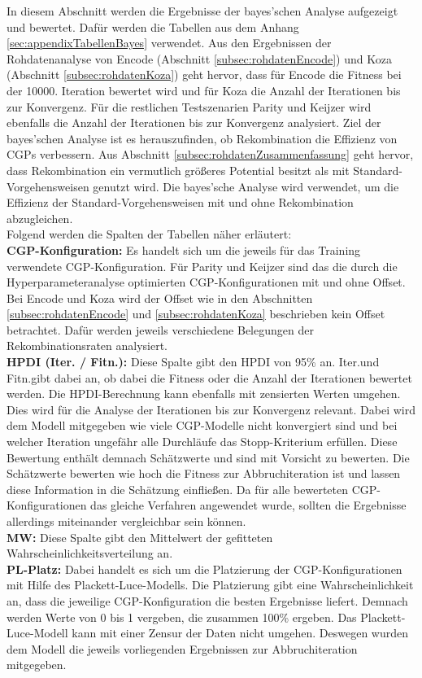 In diesem Abschnitt werden die Ergebnisse der bayes'schen Analyse aufgezeigt und bewertet.
Dafür werden die Tabellen aus dem Anhang \ref{sec:appendixTabellenBayes} verwendet.
Aus den Ergebnissen der Rohdatenanalyse von Encode (Abschnitt \ref{subsec:rohdatenEncode}) und Koza (Abschnitt \ref{subsec:rohdatenKoza}) geht hervor, dass für Encode die Fitness bei der 10000. Iteration bewertet wird und für Koza die Anzahl der Iterationen bis zur Konvergenz.
Für die restlichen Testszenarien Parity und Keijzer wird ebenfalls die Anzahl der Iterationen bis zur Konvergenz analysiert.
Ziel der bayes'schen Analyse ist es herauszufinden, ob Rekombination die Effizienz von CGPs verbessern.
Aus Abschnitt \ref{subsec:rohdatenZusammenfassung} geht hervor, dass Rekombination ein vermutlich größeres Potential besitzt als mit Standard-Vorgehensweisen genutzt wird.
Die bayes'sche Analyse wird verwendet, um die Effizienz der Standard-Vorgehensweisen mit und ohne Rekombination abzugleichen.\\
Folgend werden die Spalten der Tabellen näher erläutert:\\
\textbf{CGP-Konfiguration:} Es handelt sich um die jeweils für das Training verwendete CGP-Konfiguration.
Für Parity und Keijzer sind das die durch die Hyperparameteranalyse optimierten CGP-Konfigurationen mit und ohne Offset.
Bei Encode und Koza wird der Offset wie in den Abschnitten \ref{subsec:rohdatenEncode} und \ref{subsec:rohdatenKoza} beschrieben kein Offset betrachtet.
Dafür werden jeweils verschiedene Belegungen der Rekombinationsraten analysiert.\\
\textbf{HPDI (Iter. / Fitn.):} Diese Spalte gibt den HPDI von 95\% an.
\glqq Iter.\grqq\space und \glqq Fitn.\grqq\space gibt dabei an, ob dabei die Fitness oder die Anzahl der Iterationen bewertet werden.
Die HPDI-Berechnung kann ebenfalls mit zensierten Werten umgehen.
Dies wird für die Analyse der Iterationen bis zur Konvergenz relevant.
Dabei wird dem Modell mitgegeben wie viele CGP-Modelle nicht konvergiert sind und bei welcher Iteration ungefähr alle Durchläufe das Stopp-Kriterium erfüllen.
Diese Bewertung enthält demnach Schätzwerte und sind mit Vorsicht zu bewerten.
Die Schätzwerte bewerten wie hoch die Fitness zur Abbruchiteration ist und lassen diese Information in die Schätzung einfließen.
Da für alle bewerteten CGP-Konfigurationen das gleiche Verfahren angewendet wurde, sollten die Ergebnisse allerdings miteinander vergleichbar sein können.\\
\textbf{MW:} Diese Spalte gibt den Mittelwert der gefitteten Wahrscheinlichkeitsverteilung an.\\
\textbf{PL-Platz:} Dabei handelt es sich um die Platzierung der CGP-Konfigurationen mit Hilfe des Plackett-Luce-Modells.
Die Platzierung gibt eine Wahrscheinlichkeit an, dass die jeweilige CGP-Konfiguration die besten Ergebnisse liefert.
Demnach werden Werte von 0 bis 1 vergeben, die zusammen 100\% ergeben.
Das Plackett-Luce-Modell kann mit einer Zensur der Daten nicht umgehen.
Deswegen wurden dem Modell die jeweils vorliegenden Ergebnissen zur Abbruchiteration mitgegeben.


